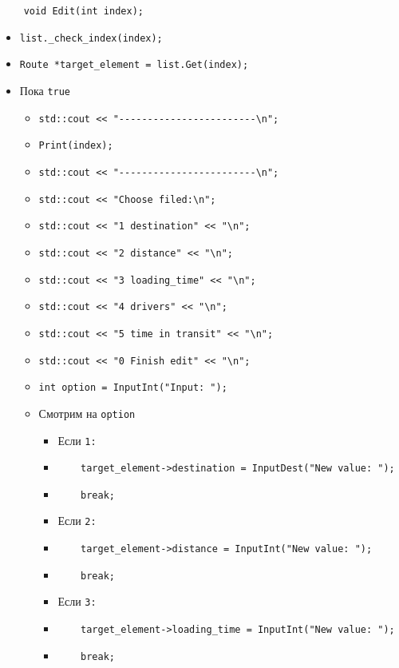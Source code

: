\begin{lstlisting}
    void Edit(int index);
\end{lstlisting}

\begin{itemize}
    \item \verb|list._check_index(index);|
    \item \verb|Route *target_element = list.Get(index);|
    \item Пока \verb|true|
        \begin{itemize}
            \item \verb|std::cout << "------------------------\n";|
            \item \verb|Print(index);|
            \item \verb|std::cout << "------------------------\n";|
            \item \verb|std::cout << "Choose filed:\n";|
            \item \verb|std::cout << "1 destination" << "\n";|
            \item \verb|std::cout << "2 distance" << "\n";|
            \item \verb|std::cout << "3 loading_time" << "\n";|
            \item \verb|std::cout << "4 drivers" << "\n";|
            \item \verb|std::cout << "5 time in transit" << "\n";|
            \item \verb|std::cout << "0 Finish edit" << "\n";|
            \item \verb|int option = InputInt("Input: ");|
            \item Смотрим на \verb|option|
            \begin{itemize}
                \item Если \verb|1:|
                \item \verb|    target_element->destination = InputDest("New value: ");|
                \item \verb|    break;|
                \item Если \verb|2:|
                \item \verb|    target_element->distance = InputInt("New value: ");|
                \item \verb|    break;|
                \item Если \verb|3:|
                \item \verb|    target_element->loading_time = InputInt("New value: ");|
                \item \verb|    break;|

\end{itemize}
\end{itemize}
\end{itemize}
